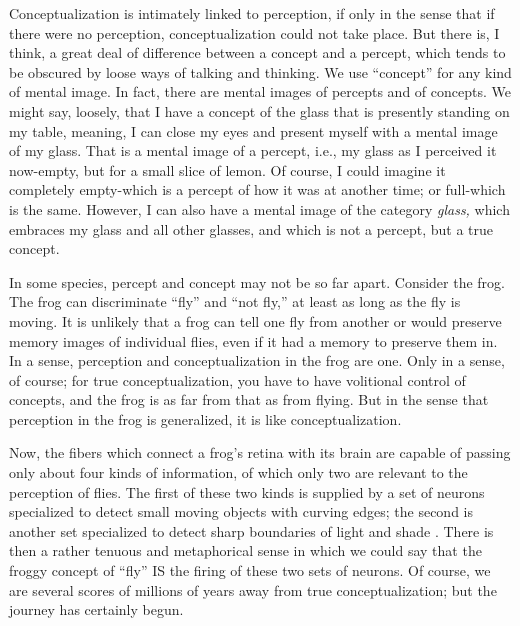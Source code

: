 Conceptualization is intimately linked to perception, if only in the sense that if there were no perception, conceptualization could not take place. But there is, I think, a great deal of difference between a concept and a percept, which tends to be obscured by loose ways of talking and thinking. We use ``concept'' for any kind of mental image. In fact, there are mental images of percepts and of concepts. We might say, loosely, that I have a concept of the glass that is presently standing on my table, meaning, I can close my eyes and present myself with a mental image of my glass. That is a mental image of a percept, i.e., my glass as I perceived it now-empty, but for a small slice of lemon. Of course, I could imagine it completely empty-which is a percept of how it was at another time; or full-which is the same. However, I can also have a mental image of the category \textit{glass,} which embraces
my glass and all other glasses, and which is not a percept, but a true concept.

In some species, percept and concept may not be so far apart.
Consider the frog. The frog can discriminate ``fly'' and ``not fly,'' at least as long as the fly is moving. It is unlikely that a frog can tell one fly from another or would preserve memory images of individual flies, even if it had a memory to preserve them in. In a sense, percep\-tion and conceptualization in the frog are one. Only in a sense, of course; for true conceptualization, you have to have volitional con\-trol of concepts, and the frog is as far from that as from flying. But in the sense that perception in the frog is generalized, it is like con\-ceptualization.

Now, the fibers which connect a frog's retina with its brain are capable of passing only about four kinds of information, of which only two are relevant to the perception of flies. The first of these two kinds is supplied by a set of neurons specialized to detect small moving objects with curving edges; the second is another set specialized to detect sharp boundaries of light and shade \citep{Burton1970}. There is then a rather tenuous and metaphorical sense in which we could say that the froggy concept of ``fly'' IS the firing of these two sets of neurons. Of course, we are several scores of millions of years away from true conceptualization; but the journey has certainly begun.

